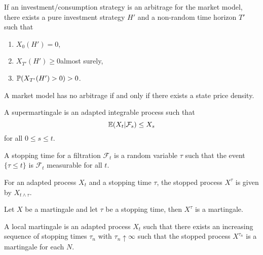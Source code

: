 \begin{thm}
  \label{sec:arbitrage-theory-6}
  If an investment/consumption strategy is an arbitrage for the
  market model, there exists a pure investment strategy $H'$ and a
  non-random time horizon $T'$ such that
  \begin{enumerate}
  \item $X_{0}(H') = 0$,
  \item $X_{T'}(H') \geq 0$almost surely,
  \item $\Prob{X_{T'}(H') > 0} > 0$.
  \end{enumerate}
\end{thm}

\begin{thm}
  \label{sec:arbitrage-theory-7}
  A market model has no arbitrage if and only if there exists a state
  price density.
\end{thm}

\begin{defn}
  \label{sec:arbitrage-theory-14}
  A supermartingale is an adapted integrable process such that
  \begin{equation}
    \label{eq:3}
    \E{X_{t} | \mathcal{F}_{s}} \leq X_{s}
  \end{equation} for all $0 \leq s \leq t$.
\end{defn}

\begin{defn}
  \label{sec:arbitrage-theory-8}
  A stopping time for a filtration $\mathcal{F}_{t}$ is a random
  variable $\tau$  such that the event $\{ \tau \leq t \}$ is
  $\mathcal{F}_{t}$ measurable for all $t$.
\end{defn}

\begin{defn}
  \label{sec:arbitrage-theory-9}
  For an adapted process $X_{t}$ and a stopping time $\tau$, the
  stopped process $X^{\tau}$ is given by $X_{t \wedge \tau}$.
\end{defn}

\begin{thm}
  \label{sec:arbitrage-theory-10}
  Let $X$ be a martingale and let $\tau$ be a stopping time, then
  $X^{\tau}$ is a martingale.
\end{thm}

\begin{defn}
  \label{sec:arbitrage-theory-11}
  A local martingale is an adapted process $X_{t}$ such that there
  exists an increasing sequence of stopping times $\tau_{n}$ with
  $\tau_{n} \uparrow \infty$ such that the stopped process
  $X^{\tau_{n}}$ is a martingale for each $N$.
\end{defn}

